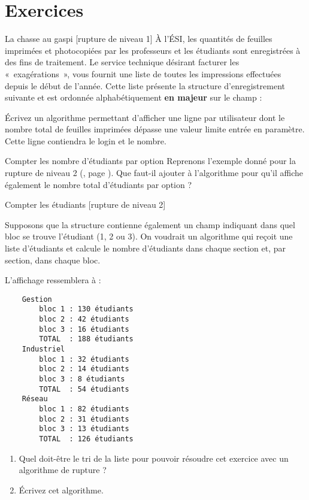 \section{Exercices}


\begin{Exercice}{La chasse au gaspi [rupture de niveau 1]}
	À l’ÉSI, les quantités de feuilles imprimées et photocopiées 
	par les professeurs et les étudiants sont enregistrées à des fins de traitement.
	Le service technique désirant facturer les «~exagérations~», 
	vous fournit une liste de toutes les impressions effectuées depuis le début de l'année.
	Cette liste présente la structure d’enregistrement  suivante 
	et est ordonnée alphabétiquement \textbf{en majeur} sur le champ   :

	\begin{LDA}
		\EndStruct
	\end{LDA}

	Écrivez un algorithme permettant d'afficher une ligne par
	utilisateur dont le nombre total de feuilles imprimées dépasse une
	valeur limite entrée en paramètre. 
	Cette ligne contiendra le login et le nombre.
\end{Exercice}

\begin{Exercice}{Compter les nombre d'étudiants par option}
	Reprenons l'exemple donné pour la rupture de niveau 2 (, page \pageref{algo:rupt2}).
	Que faut-il ajouter à l'algorithme pour qu'il affiche également 
	le nombre total d'étudiants par option ?
\end{Exercice}

\begin{Exercice}{Compter les étudiants [rupture de niveau 2]}
	
	Supposons que la structure  contienne également
	un champ indiquant dans quel bloc se trouve l'étudiant (1, 2 ou 3).
	On voudrait un algorithme qui reçoit une liste d'étudiants et calcule
	le nombre d'étudiants dans chaque section et, par section, dans chaque bloc.
	
	L'affichage ressemblera à :
	{\small
	\begin{verbatim}
    Gestion
        bloc 1 : 130 étudiants
        bloc 2 : 42 étudiants
        bloc 3 : 16 étudiants
        TOTAL  : 188 étudiants
    Industriel
        bloc 1 : 32 étudiants
        bloc 2 : 14 étudiants
        bloc 3 : 8 étudiants
        TOTAL  : 54 étudiants
    Réseau
        bloc 1 : 82 étudiants
        bloc 2 : 31 étudiants
        bloc 3 : 13 étudiants
        TOTAL  : 126 étudiants
	\end{verbatim}
	}
	\begin{enumerate}[label=\alph*)]
		\item 
		Quel doit-être le tri de la liste pour pouvoir résoudre cet exercice
		avec un algorithme de rupture ?
		\item 
		Écrivez cet algorithme.
	\end{enumerate}
\end{Exercice}
	
